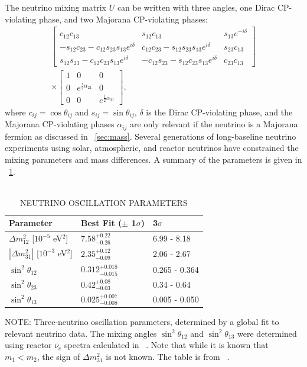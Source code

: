 The neutrino mixing matrix $U$ can be written with three angles, one Dirac CP-violating phase, and two Majorana CP-violating phases:
\begin{multline}
\begin{bmatrix}
c_{12}c_{13} & s_{12}c_{13} & s_{13}e^{-i\delta} \\
-s_{12}c_{23}-c_{12}s_{23}s_{13}e^{i\delta} & c_{12}c_{23}-s_{12}s_{23}s_{13}e^{i\delta} & s_{23}c_{13} \\
s_{12}s_{23}-c_{12}c_{23}s_{13}e^{i\delta} & -c_{12}s_{23}-s_{12}c_{23}s_{13}e^{i\delta} & c_{23}c_{13} 
\end{bmatrix} 
\\
\times 
\begin{bmatrix}
1 & 0 & 0 \\
0 & e^{\frac{i}{2}\alpha_{21}} & 0 \\
0 & 0 & e^{\frac{i}{2}\alpha_{31}}
\end{bmatrix}
,
\end{multline}
where $c_{ij} = \cos{\theta_{ij}}$ and $s_{ij} = \sin{\theta_{ij}}$, $\delta$ is the Dirac CP-violating phase, and the Majorana CP-violating phases $\alpha_{ij}$ are only relevant if the neutrino is a Majorana fermion as discussed in {\sect}~\ref{sec:mass}.  Several generations of long-baseline neutrino experiments using solar, atmospheric, and reactor neutrinos have constrained the mixing parameters and mass differences.  A summary of the parameters is given in {\tab}~\ref{tab:neutrinoParameters}.
\begin{table}
\begin{center}
\caption[\uppercase{Neutrino oscillation parameters}]{\\\uppercase{Neutrino oscillation parameters} \label{tab:neutrinoParameters}}
\begin{tabular}{lll}\toprule
Parameter & Best Fit ($\pm$ 1$\sigma$) & 3$\sigma$ \\
\midrule
${\Delta}m^2_{12}$ [$10^{-5}$ eV$^2$] & $7.58^{+0.22}_{-0.26}$ & 6.99 - 8.18 \\
$|{\Delta}m^2_{31}|$ [$10^{-3}$ eV$^2$] & $2.35^{+0.12}_{-0.09}$ & 2.06 - 2.67 \\
$\sin^2{\theta_{12}}$ & $0.312^{+0.018}_{-0.015}$ & 0.265 - 0.364 \\  
$\sin^2{\theta_{23}}$ & $0.42^{+0.08}_{-0.03}$ & 0.34 - 0.64 \\  
$\sin^2{\theta_{13}}$ & $0.025^{+0.007}_{-0.008}$ & 0.005 - 0.050 \\   
\bottomrule  
\end{tabular}
\begin{flushleft}
\small NOTE: 
Three-neutrino oscillation parameters, determined by a global fit to relevant neutrino data.   The mixing angles $\sin^2{\theta_{12}}$ and $\sin^2{\theta_{13}}$ were determined using reactor $\overline{\nu}_e$ spectra calculated in {}~\citep{reactorNeutrinoSpectrum}.  Note that while it is known that $m_1 < m_2$, the sign of ${\Delta}m^2_{31}$ is not known.  The table is from {}~\citep{PDG}.
\end{flushleft}
\end{center}
\end{table}
